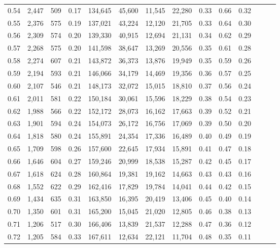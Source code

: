\begin{tabular}{rrrrrrrrrrrrrr}
0.54 &  2,447 &  509 &  0.17 &  134,645 &   45,600 &  11,545 &  22,280 &  0.33 &  0.66 &      0.32 \\
0.55 &  2,376 &  575 &  0.19 &  137,021 &   43,224 &  12,120 &  21,705 &  0.33 &  0.64 &      0.30 \\
0.56 &  2,309 &  574 &  0.20 &  139,330 &   40,915 &  12,694 &  21,131 &  0.34 &  0.62 &      0.29 \\
0.57 &  2,268 &  575 &  0.20 &  141,598 &   38,647 &  13,269 &  20,556 &  0.35 &  0.61 &      0.28 \\
0.58 &  2,274 &  607 &  0.21 &  143,872 &   36,373 &  13,876 &  19,949 &  0.35 &  0.59 &      0.26 \\
0.59 &  2,194 &  593 &  0.21 &  146,066 &   34,179 &  14,469 &  19,356 &  0.36 &  0.57 &      0.25 \\
0.60 &  2,107 &  546 &  0.21 &  148,173 &   32,072 &  15,015 &  18,810 &  0.37 &  0.56 &      0.24 \\
0.61 &  2,011 &  581 &  0.22 &  150,184 &   30,061 &  15,596 &  18,229 &  0.38 &  0.54 &      0.23 \\
0.62 &  1,988 &  566 &  0.22 &  152,172 &   28,073 &  16,162 &  17,663 &  0.39 &  0.52 &      0.21 \\
0.63 &  1,901 &  594 &  0.24 &  154,073 &   26,172 &  16,756 &  17,069 &  0.39 &  0.50 &      0.20 \\
0.64 &  1,818 &  580 &  0.24 &  155,891 &   24,354 &  17,336 &  16,489 &  0.40 &  0.49 &      0.19 \\
0.65 &  1,709 &  598 &  0.26 &  157,600 &   22,645 &  17,934 &  15,891 &  0.41 &  0.47 &      0.18 \\
0.66 &  1,646 &  604 &  0.27 &  159,246 &   20,999 &  18,538 &  15,287 &  0.42 &  0.45 &      0.17 \\
0.67 &  1,618 &  624 &  0.28 &  160,864 &   19,381 &  19,162 &  14,663 &  0.43 &  0.43 &      0.16 \\
0.68 &  1,552 &  622 &  0.29 &  162,416 &   17,829 &  19,784 &  14,041 &  0.44 &  0.42 &      0.15 \\
0.69 &  1,434 &  635 &  0.31 &  163,850 &   16,395 &  20,419 &  13,406 &  0.45 &  0.40 &      0.14 \\
0.70 &  1,350 &  601 &  0.31 &  165,200 &   15,045 &  21,020 &  12,805 &  0.46 &  0.38 &      0.13 \\
0.71 &  1,206 &  517 &  0.30 &  166,406 &   13,839 &  21,537 &  12,288 &  0.47 &  0.36 &      0.12 \\
0.72 &  1,205 &  584 &  0.33 &  167,611 &   12,634 &  22,121 &  11,704 &  0.48 &  0.35 &      0.11 \\

\end{tabular}
